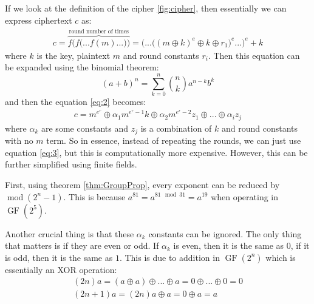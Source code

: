 \documentclass{Resources/UoBLab1}
\theoremstyle{definition}
\begin{document}
If we look at the definition of the cipher \ref{fig:cipher}, then essentially we can express ciphertext $c$ as:
\begin{equation}
    \begin{array}{c}
         c = \overbrace{f\Big(f\big(...f(m)...\big)\Big)}^{\text{round number of times}} =\Big(...\big((m \oplus k)^e \oplus k \oplus r_1\big)^e ... \Big)^e + k
    \end{array}\label{eq:2}
\end{equation}
where $k$ is the key, plaintext $m$ and round constants $r_i$. Then this equation can be expanded using the binomial theorem:
\[
    (a + b)^n = \sum^n_{k=0}\binom{n}{k}a^{n-k}b^{k}
\]
and then the equation \eqref{eq:2} becomes:
\begin{equation}
    \begin{array}{c}
         c = m^{e^r} \oplus \alpha_1m^{e^r-1}k \oplus \alpha_2m^{e^r-2}z_1 \oplus ... \oplus \alpha_iz_j
    \end{array}\label{eq:3}
\end{equation}
where $\alpha_k$ are some constants and $z_j$ is a combination of $k$ and round constants with no $m$ term. So in essence, instead of repeating the rounds, we can just use equation \eqref{eq:3}, but this is computationally more expensive. However, this can be further simplified using finite fields.

First, using theorem \ref{thm:GroupProp}, every exponent can be reduced by $\operatorname{mod} (2^n - 1)$. This is because $a^{81} = a^{81 \mod 31} = a^{19}$ when operating in $\operatorname{GF}(2^5)$.

Another crucial thing is that these $\alpha_k$ constants can be ignored. The only thing that matters is if they are even or odd. If $\alpha_k$ is even, then it is the same as $0$, if it is odd, then it is the same as $1$. This is due to addition in $\operatorname{GF}(2^n)$ which is essentially an XOR operation:
\begin{gather*}
    (2n)a = (a \oplus a) \oplus ... \oplus a = 0 \oplus ... \oplus 0 = 0 \\
    (2n+1)a = (2n)a \oplus a = 0 \oplus a = a
\end{gather*}
\end{document}
